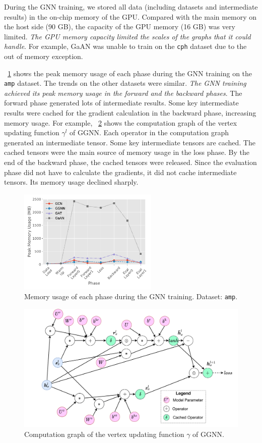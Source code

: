 During the GNN training, we stored all data (including datasets and intermediate results) in the on-chip memory of the GPU.
%
Compared with the main memory on the host side (90 GB), the capacity of the GPU memory (16 GB) was very limited.
%
\emph{The GPU memory capacity limited the scales of the graphs that it could handle}.
%
For example, GaAN was unable to train on the \texttt{cph} dataset due to the out of memory exception.

\figurename~\ref{fig:exp_memory_usage_stage_amp} shows the peak memory usage of each phase during the GNN training on the \texttt{amp} dataset.
%
The trends on the other datasets were similar.
%
\emph{The GNN training achieved its peak memory usage in the forward and the backward phases}.
%
The forward phase generated lots of intermediate results.
%
Some key intermediate results were cached for the gradient calculation in the backward phase, increasing memory usage.
%
For example, \figurename~\ref{fig:ggnn_vertex_func_computation_graph} shows the computation graph of the vertex updating function $\gamma^l$ of GGNN.
%
Each operator in the computation graph generated an intermediate tensor.
%
Some key intermediate tensors are cached.
%
The cached tensors were the main source of memory usage in the loss phase.
%
By the end of the backward phase, the cached tensors were released.
%
Since the evaluation phase did not have to calculate the gradients, it did not cache intermediate tensors.
%
Its memory usage declined sharply.

\begin{figure}[H]
    \centering
    \includegraphics[height=5cm]{figs/experiments/exp_memory_usage_stage_amp.pdf}
    \caption{Memory usage of each phase during the GNN training. Dataset: \texttt{amp}.}
    \label{fig:exp_memory_usage_stage_amp}
\end{figure}

\begin{figure}[H]
    \centering
    \includegraphics[width=0.7\columnwidth]{figs/illustration/ggnn_vertex_func_computation_graph.pdf}
    \caption{Computation graph of the vertex updating function $\gamma$ of GGNN.}
    \label{fig:ggnn_vertex_func_computation_graph}
\end{figure}

